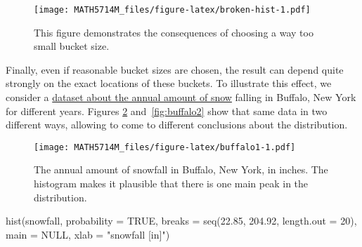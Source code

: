 \documentclass[
  a4paper,
]{article}
\newenvironment{Shaded}{\begin{snugshade}}{\end{snugshade}}
\newcommand{\AttributeTok}[1]{\textcolor[rgb]{0.77,0.63,0.00}{#1}}
\newcommand{\CommentTok}[1]{\textcolor[rgb]{0.56,0.35,0.01}{\textit{#1}}}
\newcommand{\ConstantTok}[1]{\textcolor[rgb]{0.00,0.00,0.00}{#1}}
\newcommand{\DecValTok}[1]{\textcolor[rgb]{0.00,0.00,0.81}{#1}}
\newcommand{\FloatTok}[1]{\textcolor[rgb]{0.00,0.00,0.81}{#1}}
\newcommand{\FunctionTok}[1]{\textcolor[rgb]{0.00,0.00,0.00}{#1}}
\newcommand{\NormalTok}[1]{#1}
\newcommand{\OtherTok}[1]{\textcolor[rgb]{0.56,0.35,0.01}{#1}}
\newcommand{\SpecialCharTok}[1]{\textcolor[rgb]{0.00,0.00,0.00}{#1}}
\newcommand{\StringTok}[1]{\textcolor[rgb]{0.31,0.60,0.02}{#1}}
\theoremstyle{definition}
\theoremstyle{definition}
\theoremstyle{definition}
\theoremstyle{definition}
\theoremstyle{remark}
\begin{document}
\begin{figure}
\centering
\texttt{[image: MATH5714M\_files/figure-latex/broken-hist-1.pdf]}
\caption{\label{fig:broken-hist}This figure demonstrates the consequences of choosing a way too small bucket size.}
\end{figure}

Finally, even if reasonable bucket sizes are chosen, the result can
depend quite strongly on the exact locations of these buckets. To illustrate
this effect, we consider a
\href{https://teaching.seehuhn.de/data/buffalo/}{dataset about the annual amount of snow}
falling in Buffalo, New York for different years. Figures \ref{fig:buffalo1}
and~\ref{fig:buffalo2} show that same data in two different ways,
allowing to come to different conclusions about the distribution.



\begin{Shaded}
\end{Shaded}

\begin{figure}
\centering
\texttt{[image: MATH5714M\_files/figure-latex/buffalo1-1.pdf]}
\caption{\label{fig:buffalo1}The annual amount of snowfall in Buffalo, New York, in inches. The histogram makes it plausible that there is one main peak in the distribution.}
\end{figure}



\begin{Shaded}
\begin{Highlighting}[]
\FunctionTok{hist}\NormalTok{(snowfall, }\AttributeTok{probability =} \ConstantTok{TRUE}\NormalTok{,}
     \AttributeTok{breaks =} \FunctionTok{seq}\NormalTok{(}\FloatTok{22.85}\NormalTok{, }\FloatTok{204.92}\NormalTok{, }\AttributeTok{length.out =} \DecValTok{20}\NormalTok{),}
     \AttributeTok{main =} \ConstantTok{NULL}\NormalTok{, }\AttributeTok{xlab =} \StringTok{"snowfall [in]"}\NormalTok{)}
\end{Highlighting}
\end{Shaded}
\end{document}
